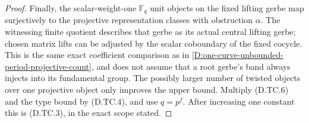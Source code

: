 \begin{proof}
Finally, the scalar-weight-one
$\mathbb F_q$ unit objects on the
fixed lifting gerbe map surjectively
to the projective representation
classes with obstruction $\alpha$.
The witnessing finite quotient
describes that gerbe as its actual
central lifting gerbe; chosen
matrix lifts can be adjusted by
the scalar coboundary of the fixed
cocycle. This is the same exact
coefficient comparison as in
\ref{D:one-curve-unbounded-period-projective-count},
and does not assume that a root
gerbe's band always injects into
its fundamental group. The possibly
larger number of twisted objects
over one projective object only
improves the upper bound.
Multiply (D.TC.6) and the type bound
by (D.TC.4), and use $q=p^f$.
After increasing one constant this
is (D.TC.3), in the exact scope stated.
\end{proof}
